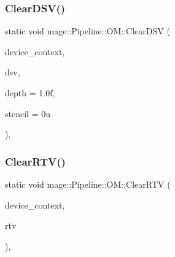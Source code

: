 \hypertarget{structmage_1_1_pipeline_1_1_o_m_a908c10af159007645e15df6264216c74}{}\label{structmage_1_1_pipeline_1_1_o_m_a908c10af159007645e15df6264216c74} 
\subsubsection{\texorpdfstring{Clear\+D\+S\+V()}{ClearDSV()}}
{\footnotesize\ttfamily static void mage\+::\+Pipeline\+::\+O\+M\+::\+Clear\+D\+SV (\begin{DoxyParamCaption}\item[{I\+D3\+D11\+Device\+Context2 $\ast$}]{device\+\_\+context,  }\item[{I\+D3\+D11\+Depth\+Stencil\+View $\ast$}]{dsv,  }\item[{\hyperlink{namespacemage_a6a44ad388483959dc4dff9f2aef91431}{f32}}]{depth = {\ttfamily 1.0f},  }\item[{\hyperlink{namespacemage_a5a362e2d56fc439362a80516ecae7828}{u8}}]{stencil = {\ttfamily 0u} }\end{DoxyParamCaption})\hspace{0.3cm}{\ttfamily [static]}, {\ttfamily [noexcept]}}

\hypertarget{structmage_1_1_pipeline_1_1_o_m_a0a40eb7a844d2861e74582879afec962}{}\label{structmage_1_1_pipeline_1_1_o_m_a0a40eb7a844d2861e74582879afec962} 
\subsubsection{\texorpdfstring{Clear\+R\+T\+V()}{ClearRTV()}\hspace{0.1cm}{\footnotesize\ttfamily [1/2]}}
{\footnotesize\ttfamily static void mage\+::\+Pipeline\+::\+O\+M\+::\+Clear\+R\+TV (\begin{DoxyParamCaption}\item[{I\+D3\+D11\+Device\+Context2 $\ast$}]{device\+\_\+context,  }\item[{I\+D3\+D11\+Render\+Target\+View $\ast$}]{rtv }\end{DoxyParamCaption})\hspace{0.3cm}{\ttfamily [static]}, {\ttfamily [noexcept]}}

\hypertarget{structmage_1_1_pipeline_1_1_o_m_a6cb6b441bafb502889cfc09aca6c6e03}{}\label{structmage_1_1_pipeline_1_1_o_m_a6cb6b441bafb502889cfc09aca6c6e03} 
